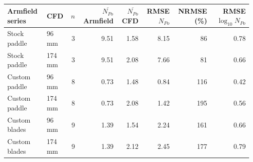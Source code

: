 \begin{tabular}{@{}llrrrrrr@{}}
\toprule
Armfield series & CFD & $n$ & $\overline{N_{Po}}$ Armfield & $\overline{N_{Po}}$ CFD & RMSE $N_{Po}$ & NRMSE (\%) & RMSE $\log_{10}N_{Po}$ \\
\midrule
Stock paddle & 96 mm & 3 & 9.51 & 1.58 & 8.15 & 86 & 0.78 \\
Stock paddle & 174 mm & 3 & 9.51 & 2.08 & 7.66 & 81 & 0.66 \\
Custom paddle & 96 mm & 8 & 0.73 & 1.48 & 0.84 & 116 & 0.42 \\
Custom paddle & 174 mm & 8 & 0.73 & 2.08 & 1.42 & 195 & 0.56 \\
Custom blades & 96 mm & 9 & 1.39 & 1.54 & 2.24 & 161 & 0.66 \\
Custom blades & 174 mm & 9 & 1.39 & 2.12 & 2.45 & 177 & 0.79 \\
\bottomrule
\end{tabular}

